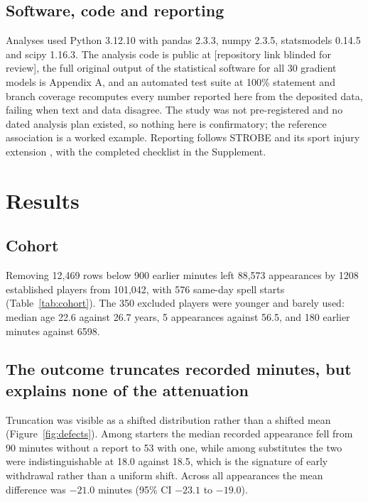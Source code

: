 \documentclass[11pt]{article}
\newcommand{\repositorylink}{[repository link blinded for review]}
\newcommand{\repositorylink}{\url{https://github.com/Gustolandia/football-denominator-gradient}}
\begin{document}
\subsection{Software, code and reporting}

Analyses used Python 3.12.10 with pandas 2.3.3, numpy 2.3.5, statsmodels 0.14.5 and scipy 1.16.3. The analysis code is public at \repositorylink{}, the full original output of the statistical software for all 30 gradient models is Appendix A, and an automated test suite at 100\% statement and branch coverage recomputes every number reported here from the deposited data, failing when text and data disagree. The study was not pre-registered and no dated analysis plan existed, so nothing here is confirmatory; the reference association is a worked example. Reporting follows STROBE \cite{vonelm2007strobe} and its sport injury extension \cite{bahr2020ioc}, with the completed checklist in the Supplement.

\section{Results}

\subsection{Cohort}

Removing 12,469 rows below 900 earlier minutes left 88,573 appearances by 1208 established players from 101,042, with 576 same-day spell starts (Table~\ref{tab:cohort}). The 350 excluded players were younger and barely used: median age 22.6 against 26.7 years, 5 appearances against 56.5, and 180 earlier minutes against 6598.

\subsection{The outcome truncates recorded minutes, but explains none of the attenuation}

Truncation was visible as a shifted distribution rather than a shifted mean (Figure~\ref{fig:defects}). Among starters the median recorded appearance fell from 90 minutes without a report to 53 with one, while among substitutes the two were indistinguishable at 18.0 against 18.5, which is the signature of early withdrawal rather than a uniform shift. Across all appearances the mean difference was $-21.0$ minutes (95\% CI $-23.1$ to $-19.0$).
\end{document}
